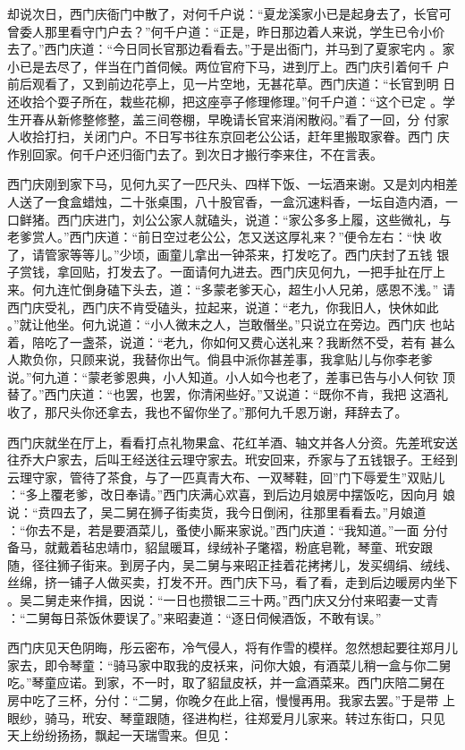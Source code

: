却说次日，西门庆衙门中散了，对何千户说：“夏龙溪家小已是起身去了，长官可
曾委人那里看守门户去？”何千户道：“正是，昨日那边着人来说，学生已令小价
去了。”西门庆道：“今日同长官那边看看去。”于是出衙门，并马到了夏家宅内
。家小已是去尽了，伴当在门首伺候。两位官府下马，进到厅上。西门庆引着何千
户前后观看了，又到前边花亭上，见一片空地，无甚花草。西门庆道：“长官到明
日还收拾个耍子所在，栽些花柳，把这座亭子修理修理。”何千户道：“这个已定
。学生开春从新修整修整，盖三间卷棚，早晚请长官来消闲散闷。”看了一回，分
付家人收拾打扫，关闭门户。不日写书往东京回老公公话，赶年里搬取家眷。西门
庆作别回家。何千户还归衙门去了。到次日才搬行李来住，不在言表。

西门庆刚到家下马，见何九买了一匹尺头、四样下饭、一坛酒来谢。又是刘内相差
人送了一食盒蜡烛，二十张桌围，八十股官香，一盒沉速料香，一坛自造内酒，一
口鲜猪。西门庆进门，刘公公家人就磕头，说道：“家公多多上履，这些微礼，与
老爹赏人。”西门庆道：“前日空过老公公，怎又送这厚礼来？”便令左右：“快
收了，请管家等等儿。”少顷，画童儿拿出一钟茶来，打发吃了。西门庆封了五钱
银子赏钱，拿回贴，打发去了。一面请何九进去。西门庆见何九，一把手扯在厅上
来。何九连忙倒身磕下头去，道：“多蒙老爹天心，超生小人兄弟，感恩不浅。”
请西门庆受礼，西门庆不肯受磕头，拉起来，说道：“老九，你我旧人，快休如此
。”就让他坐。何九说道：“小人微末之人，岂敢僭坐。”只说立在旁边。西门庆
也站着，陪吃了一盏茶，说道：“老九，你如何又费心送礼来？我断然不受，若有
甚么人欺负你，只顾来说，我替你出气。倘县中派你甚差事，我拿贴儿与你李老爹
说。”何九道：“蒙老爹恩典，小人知道。小人如今也老了，差事已告与小人何钦
顶替了。”西门庆道：“也罢，也罢，你清闲些好。”又说道：“既你不肯，我把
这酒礼收了，那尺头你还拿去，我也不留你坐了。”那何九千恩万谢，拜辞去了。

西门庆就坐在厅上，看看打点礼物果盒、花红羊酒、轴文并各人分资。先差玳安送
往乔大户家去，后叫王经送往云理守家去。玳安回来，乔家与了五钱银子。王经到
云理守家，管待了茶食，与了一匹真青大布、一双琴鞋，回”门下辱爱生”双贴儿
：“多上覆老爹，改日奉请。”西门庆满心欢喜，到后边月娘房中摆饭吃，因向月
娘说：“贲四去了，吴二舅在狮子街卖货，我今日倒闲，往那里看看去。”月娘道
：“你去不是，若是要酒菜儿，蚤使小厮来家说。”西门庆道：“我知道。”一面
分付备马，就戴着毡忠靖巾，貂鼠暖耳，绿绒补子氅褶，粉底皂靴，琴童、玳安跟
随，径往狮子街来。到房子内，吴二舅与来昭正挂着花拷拷儿，发买绸绢、绒线、
丝绵，挤一铺子人做买卖，打发不开。西门庆下马，看了看，走到后边暖房内坐下
。吴二舅走来作揖，因说：“一日也攒银二三十两。”西门庆又分付来昭妻一丈青
：“二舅每日茶饭休要误了。”来昭妻道：“逐日伺候酒饭，不敢有误。”

西门庆见天色阴晦，彤云密布，冷气侵人，将有作雪的模样。忽然想起要往郑月儿
家去，即令琴童：“骑马家中取我的皮袄来，问你大娘，有酒菜儿稍一盒与你二舅
吃。”琴童应诺。到家，不一时，取了貂鼠皮袄，并一盒酒菜来。西门庆陪二舅在
房中吃了三杯，分付：“二舅，你晚夕在此上宿，慢慢再用。我家去罢。”于是带
上眼纱，骑马，玳安、琴童跟随，径进构栏，往郑爱月儿家来。转过东街口，只见
天上纷纷扬扬，飘起一天瑞雪来。但见：

